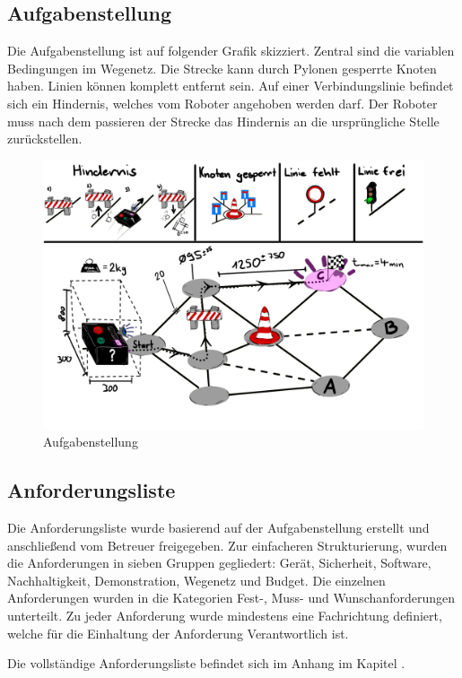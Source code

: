 \subsection{Aufgabenstellung}

Die Aufgabenstellung ist auf folgender Grafik skizziert. Zentral sind die variablen Bedingungen im Wegenetz. Die Strecke kann durch Pylonen gesperrte Knoten haben. Linien können komplett entfernt sein.  Auf einer Verbindungslinie befindet sich ein Hindernis, welches vom Roboter angehoben werden darf. Der Roboter muss nach dem passieren der Strecke das Hindernis an die ursprüngliche Stelle zurückstellen.  

\begin{figure}[H]
\centering
\includegraphics[width=\textwidth]{img/Skizze_Aufgabenstellung_v4.2.png}
\caption{Aufgabenstellung}
\label{fig:aufgebanstellung}
\end{figure}

\subsection{Anforderungsliste}

Die Anforderungsliste wurde basierend auf der Aufgabenstellung erstellt und anschließend vom Betreuer freigegeben. Zur einfacheren Strukturierung, wurden die Anforderungen in sieben Gruppen gegliedert: Gerät, Sicherheit, Software, Nachhaltigkeit, Demonstration, Wegenetz und Budget. Die einzelnen Anforderungen wurden in die Kategorien Fest-, Muss- und Wunschanforderungen unterteilt. Zu jeder Anforderung wurde mindestens eine Fachrichtung definiert, welche für die Einhaltung der
Anforderung Verantwortlich ist.

Die vollständige Anforderungsliste befindet sich im Anhang im Kapitel .